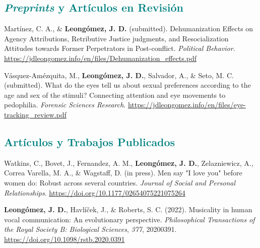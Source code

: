 \documentclass[11pt, a4paper]{awesome-cv}
\begin{document}
\hypertarget{section}{%
\subsection{\texorpdfstring{\textcolor{teal}{\textit{Preprints} y Artículos en Revisión}}{}}\label{section}}

\begingroup
\setlength{\parindent}{-0.5in}
\setlength{\leftskip}{0.5in}

\hypertarget{refs_working_paper}{}
\leavevmode{}%
Martínez, C. A., \& \textbf{Leongómez, J. D.} (submitted).
Dehumanization {Effects} on {Agency Attributions}, {Retributive Justice}
judgments, and {Resocialization Attitudes} towards {Former Perpetrators}
in {Post}-conflict. \emph{Political Behavior}.
\url{https://jdleongomez.info/en/files/Dehumanization_effects.pdf}

\leavevmode{}%
Vásquez-Amézquita, M., \textbf{Leongómez, J. D.}, Salvador, A., \& Seto,
M. C. (submitted). {What do the eyes tell us about sexual preferences
according to the age and sex of the stimuli? Connecting attention and
eye movements to pedophilia}. \emph{Forensic Sciences Research}.
\url{https://jdleongomez.info/en/files/eye-tracking_review.pdf}

\endgroup

\hypertarget{section-1}{%
\subsection{\texorpdfstring{\textcolor{teal}{Artículos y Trabajos Publicados}}{}}\label{section-1}}

\begingroup
\setlength{\parindent}{-0.5in}
\setlength{\leftskip}{0.5in}

\hypertarget{refs_journals}{}
\leavevmode{}%
Watkins, C., Bovet, J., Fernandez, A. M., \textbf{Leongómez, J. D.},
Zelazniewicz, A., Correa Varella, M. A., \& Wagstaff, D. (in press).
{Men say "I love you" before women do: Robust across several countries}.
\emph{Journal of Social and Personal Relationships}.
\url{https://doi.org/10.1177/02654075221075264}

\leavevmode{}%
\textbf{Leongómez, J. D.}, Havlíček, J., \& Roberts, S. C. (2022).
Musicality in human vocal communication: {An} evolutionary perspective.
\emph{Philosophical Transactions of the Royal Society B: Biological
Sciences}, \emph{377}, 20200391.
\url{https://doi.org/10.1098/rstb.2020.0391}
\end{document}

